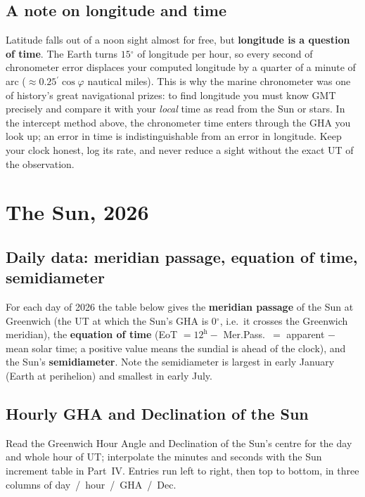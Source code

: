 \documentclass[10pt,letterpaper,twoside]{book}
\newcommand{\dg}{\ensuremath{{}^{\circ}}}
\newcommand{\pr}{\ensuremath{{}^{\prime}}}
\begin{document}
\chapter{A note on longitude and time}

Latitude falls out of a noon sight almost for free, but \textbf{longitude is a
question of time}. The Earth turns $15\dg$ of longitude per hour, so every second
of chronometer error displaces your computed longitude by a quarter of a minute of
arc ($\approx 0.25\pr\cos\varphi$ nautical miles). This is why the marine
chronometer was one of history's great navigational prizes: to find longitude you
must know GMT precisely and compare it with your \emph{local} time as read from the
Sun or stars. In the intercept method above, the chronometer time enters through
the GHA you look up; an error in time is indistinguishable from an error in
longitude. Keep your clock honest, log its rate, and never reduce a sight without
the exact UT of the observation.

\part{The Sun, 2026}
\chapter{Daily data: meridian passage, equation of time, semidiameter}

For each day of 2026 the table below gives the \textbf{meridian passage} of the
Sun at Greenwich (the UT at which the Sun's GHA is $0\dg$, i.e.\ it crosses the
Greenwich meridian), the \textbf{equation of time} (EoT $= 12^{\text{h}} -$
Mer.Pass.\ $=$ apparent $-$ mean solar time; a positive value means the sundial is
ahead of the clock), and the Sun's \textbf{semidiameter}. Note the semidiameter is
largest in early January (Earth at perihelion) and smallest in early July.

{\setlength{\tabcolsep}{3pt}}

\chapter{Hourly GHA and Declination of the Sun}

Read the Greenwich Hour Angle and Declination of the Sun's centre for the day and
whole hour of UT; interpolate the minutes and seconds with the Sun increment table
in Part~IV. Entries run left to right, then top to bottom, in three columns of
day~/~hour~/~GHA~/~Dec.
\end{document}
